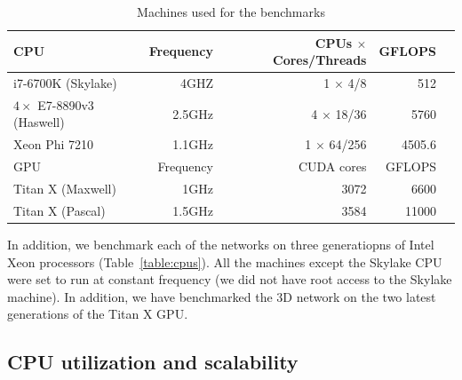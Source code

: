   \begin{table}
    \begin{center}
      \setlength\tabcolsep{2.5pt}
      \begin{tabular}{lrrrr}
        \toprule
        CPU & Frequency & CPUs $\times$ Cores/Threads & GFLOPS\\
        \midrule
        i7-6700K (Skylake) & 4GHZ & 1 $\times$ 4/8 & 512\\
        $4\times$ E7-8890v3 (Haswell) & 2.5GHz & 4 $\times$ 18/36 & 5760\\
        Xeon Phi 7210 & 1.1GHz & 1 $\times$ 64/256 & 4505.6\\
        \toprule
        GPU & Frequency & CUDA cores & GFLOPS\\
        \midrule
        Titan X (Maxwell) & 1GHz & 3072 & 6600\\
        Titan X (Pascal) & 1.5GHz & 3584  &  11000\\
        \bottomrule
      \end{tabular}
    \end{center}
    \caption{Machines used for the benchmarks}
  \end{table}

  In addition, we benchmark each of the networks on three generatiopns
  of Intel Xeon processors (Table~\ref{table:cpus}).  All the machines
  except the Skylake CPU were set to run at constant frequency (we did
  not have root access to the Skylake machine).  In addition, we have
  benchmarked the 3D network on the two latest generations of the
  Titan X GPU.

  \subsection{CPU utilization and scalability}



